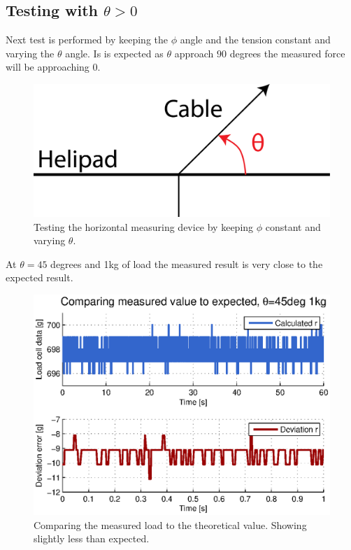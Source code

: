 \newpage
\subsection{Testing with $\theta>0$}
Next test is performed by keeping the $\phi$ angle and the tension constant and varying the $\theta$ angle. Is is expected as $\theta$ approach $90$ degrees the measured force will be approaching $0$. 
\begin{figure}[hbtp]
\centering
\includegraphics[scale=0.75]{graphics/loadcell_test2.png}
\caption{Testing the horizontal measuring device by keeping $\phi$ constant and varying $\theta$.}
\label{fig:loadcell_test2}
\end{figure}

\noindent
At $\theta=45$ degrees and 1kg of load the measured result is very close to the expected result.

\begin{figure}[hbtp]
\centering
\includegraphics[scale=1]{graphics/gcs_test/45degTheta1kg.eps}
\caption[Comparing the measured load to the theoretical value]{Comparing the measured load to the theoretical value. Showing slightly less than expected.}
\label{fig:45degTheta1kg}
\end{figure}

